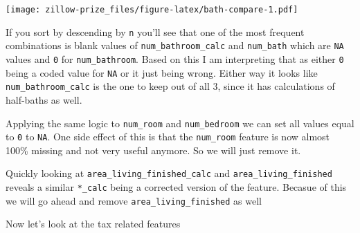 \documentclass[]{book}
\newenvironment{Shaded}{\begin{snugshade}}{\end{snugshade}}
\newcommand{\KeywordTok}[1]{\textcolor[rgb]{0.13,0.29,0.53}{\textbf{#1}}}
\newcommand{\DataTypeTok}[1]{\textcolor[rgb]{0.13,0.29,0.53}{#1}}
\newcommand{\DecValTok}[1]{\textcolor[rgb]{0.00,0.00,0.81}{#1}}
\newcommand{\FloatTok}[1]{\textcolor[rgb]{0.00,0.00,0.81}{#1}}
\newcommand{\StringTok}[1]{\textcolor[rgb]{0.31,0.60,0.02}{#1}}
\newcommand{\OtherTok}[1]{\textcolor[rgb]{0.56,0.35,0.01}{#1}}
\newcommand{\OperatorTok}[1]{\textcolor[rgb]{0.81,0.36,0.00}{\textbf{#1}}}
\newcommand{\NormalTok}[1]{#1}
\theoremstyle{definition}
\theoremstyle{definition}
\theoremstyle{definition}
\theoremstyle{remark}
\begin{document}
\texttt{[image: zillow-prize\_files/figure-latex/bath-compare-1.pdf]}

If you sort by descending by \texttt{n} you'll see that one of the most
frequent combinations is blank values of \texttt{num\_bathroom\_calc}
and \texttt{num\_bath} which are \texttt{NA} values and \texttt{0} for
\texttt{num\_bathroom}. Based on this I am interpreting that as either
\texttt{0} being a coded value for \texttt{NA} or it just being wrong.
Either way it looks like \texttt{num\_bathroom\_calc} is the one to keep
out of all 3, since it has calculations of half-baths as well.

Applying the same logic to \texttt{num\_room} and \texttt{num\_bedroom}
we can set all values equal to \texttt{0} to \texttt{NA}. One side
effect of this is that the \texttt{num\_room} feature is now almost
100\% missing and not very useful anymore. So we will just remove it.

Quickly looking at \texttt{area\_living\_finished\_calc} and
\texttt{area\_living\_finished} reveals a similar \texttt{*\_calc} being
a corrected version of the feature. Becasue of this we will go ahead and
remove \texttt{area\_living\_finished} as well

\begin{Shaded}
\end{Shaded}

Now let's look at the tax related features

\begin{Shaded}
\end{Shaded}
\end{document}
